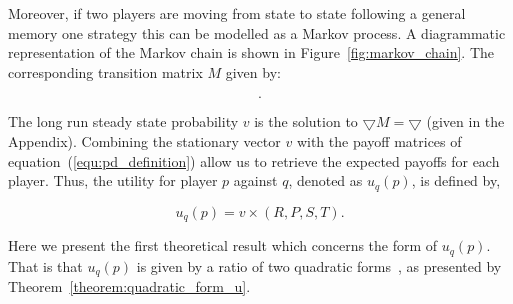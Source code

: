 \documentclass[10pt]{article}
\begin{document}
Moreover, if two players are moving from state to state following a general
memory one strategy this can be modelled as a Markov process. A diagrammatic
representation of the Markov chain is shown in Figure~\ref{fig:markov_chain}.
The corresponding transition matrix \(M\) given by:

\begin{equation}\label{eq:m_matrix}
    .
\end{equation}

The long run steady state probability \(v\) is the solution to \(\bigtriangledown M = \bigtriangledown\)
(given in the Appendix). %
Combining the stationary vector \(v\) with the payoff matrices of equation~(\ref{equ:pd_definition})
allow us to retrieve the expected payoffs for each player. Thus, the utility for
player \(p\) against \(q\), denoted as \(u_q(p)\), is defined by,

\begin{equation}\label{eq:press_dyson_utility}
    u_q(p) = v \times (R, P, S, T).
\end{equation}

Here we present the first theoretical result which concerns the form of \(u_q(p)\).
That is that \(u_q(p)\) is given by a ratio of two quadratic forms~\cite{kepner2011},
as presented by Theorem~\ref{theorem:quadratic_form_u}.
\end{document}
